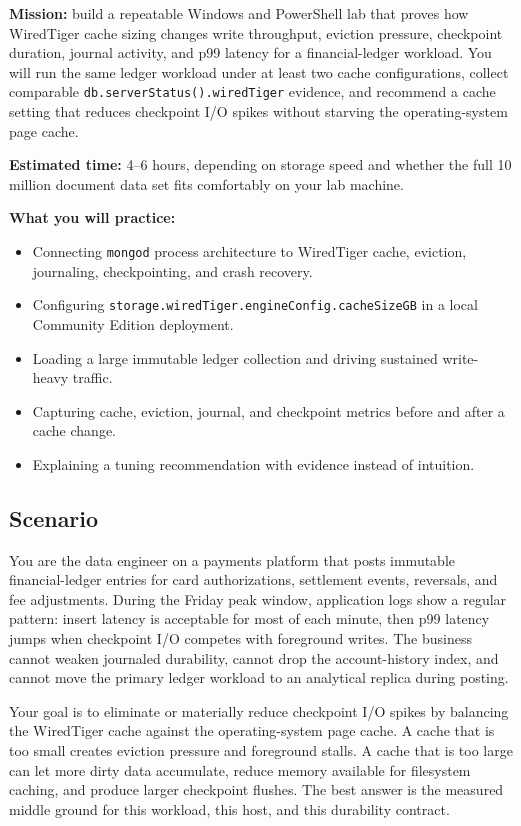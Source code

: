 \begin{capstonebox}
\textbf{Mission:} build a repeatable Windows and PowerShell lab that proves how WiredTiger cache sizing changes write throughput, eviction pressure, checkpoint duration, journal activity, and p99 latency for a financial-ledger workload. You will run the same ledger workload under at least two cache configurations, collect comparable \texttt{db.serverStatus().wiredTiger} evidence, and recommend a cache setting that reduces checkpoint I/O spikes without starving the operating-system page cache.

\textbf{Estimated time:} 4--6 hours, depending on storage speed and whether the full 10 million document data set fits comfortably on your lab machine.

\textbf{What you will practice:}
\begin{itemize}
    \item Connecting \texttt{mongod} process architecture to WiredTiger cache, eviction, journaling, checkpointing, and crash recovery.
    \item Configuring \texttt{storage.wiredTiger.engineConfig.cacheSizeGB} in a local Community Edition deployment.
    \item Loading a large immutable ledger collection and driving sustained write-heavy traffic.
    \item Capturing cache, eviction, journal, and checkpoint metrics before and after a cache change.
    \item Explaining a tuning recommendation with evidence instead of intuition.
\end{itemize}
\end{capstonebox}

\subsection*{Scenario}
You are the data engineer on a payments platform that posts immutable financial-ledger entries for card authorizations, settlement events, reversals, and fee adjustments. During the Friday peak window, application logs show a regular pattern: insert latency is acceptable for most of each minute, then p99 latency jumps when checkpoint I/O competes with foreground writes. The business cannot weaken journaled durability, cannot drop the account-history index, and cannot move the primary ledger workload to an analytical replica during posting.

Your goal is to eliminate or materially reduce checkpoint I/O spikes by balancing the WiredTiger cache against the operating-system page cache. A cache that is too small creates eviction pressure and foreground stalls. A cache that is too large can let more dirty data accumulate, reduce memory available for filesystem caching, and produce larger checkpoint flushes. The best answer is the measured middle ground for this workload, this host, and this durability contract.

